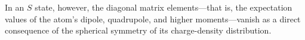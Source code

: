In an $S$ state, however, the diagonal matrix elements---that is, the expectation values of the atom's dipole, quadrupole, and higher moments---vanish as a direct consequence of the spherical symmetry of its charge-density distribution.
